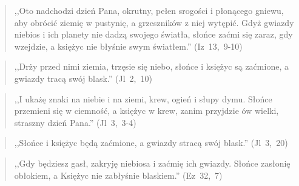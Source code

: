 \documentclass[10pt,a4paper,oneside]{article}
\begin{document}
\begin{quote}
,,Oto nadchodzi dzień Pana, okrutny, pełen srogości i płonącego gniewu, aby obrócić ziemię w pustynię, a grzeszników z niej wytępić. Gdyż gwiazdy niebios i ich planety nie dadzą swojego światła, słońce zaćmi się zaraz, gdy wzejdzie, a księżyc nie błyśnie swym światłem.'' \mbox{(Iz 13, 9-10)}
\end{quote}
\begin{quote}
,,Drży przed nimi ziemia, trzęsie się niebo, słońce i księżyc są zaćmione, a gwiazdy tracą swój blask.'' \mbox{(Jl 2, 10)}
\end{quote}
\begin{quote}
,,I ukażę znaki na niebie i na ziemi, krew, ogień i słupy dymu. Słońce przemieni się w ciemność, a księżyc w krew, zanim przyjdzie ów wielki, straszny dzień Pana.'' \mbox{(Jl 3, 3-4)}
\end{quote}
\begin{quote}
,,Słońce i księżyc będą zaćmione, a gwiazdy stracą swój blask.'' \mbox{(Jl 3, 20)}
\end{quote}
\begin{quote}
,,Gdy będziesz gasł, zakryję niebiosa i zaćmię ich gwiazdy. Słońce zasłonię obłokiem, a Księżyc nie zabłyśnie blaskiem.'' \mbox{(Ez 32, 7)}
\end{quote}
\end{document}
